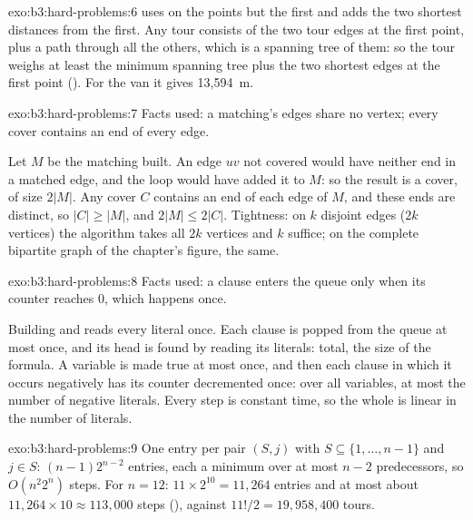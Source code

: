 \begin{solution}{exo:b3:hard-problems:6}
 uses  on the points but the first and adds the two shortest distances from the first. Any tour consists of the two tour edges at the first point, plus a path through all the others, which is a spanning tree of them: so the tour weighs at least the minimum spanning tree plus the two shortest edges at the first point (). For the van it gives 13,594~m.
\end{solution}

\begin{solution}{exo:b3:hard-problems:7}
Facts used: a matching's edges share no vertex; every cover contains an end of every edge.

Let $M$ be the matching built. An edge $uv$ not covered would have neither end in a matched edge, and the loop would have added it to $M$: so the result is a cover, of size $2|M|$. Any cover $C$ contains an end of each edge of $M$, and these ends are distinct, so $|C| \ge |M|$, and $2|M| \le 2|C|$. Tightness: on $k$ disjoint edges ($2k$ vertices) the algorithm takes all $2k$ vertices and $k$ suffice; on the complete bipartite graph of the chapter's figure, the same.
\end{solution}

\begin{solution}{exo:b3:hard-problems:8}
Facts used: a clause enters the queue only when its counter reaches 0, which happens once.

Building  and  reads every literal once. Each clause is popped from the queue at most once, and its head is found by reading its literals: total, the size of the formula. A variable is made true at most once, and then each clause in which it occurs negatively has its counter decremented once: over all variables, at most the number of negative literals. Every step is constant time, so the whole is linear in the number of literals.
\end{solution}

\begin{solution}{exo:b3:hard-problems:9}
One entry per pair $(S, j)$ with $S \subseteq \{1, \ldots, n - 1\}$ and $j \in S$: $(n - 1)2^{n - 2}$ entries, each a minimum over at most $n - 2$ predecessors, so $O(n^2 2^n)$ steps. For $n = 12$: $11 \times 2^{10} = 11{,}264$ entries and at most about $11{,}264 \times 10 \approx 113{,}000$ steps (), against $11!/2 = 19{,}958{,}400$ tours.
\end{solution}

